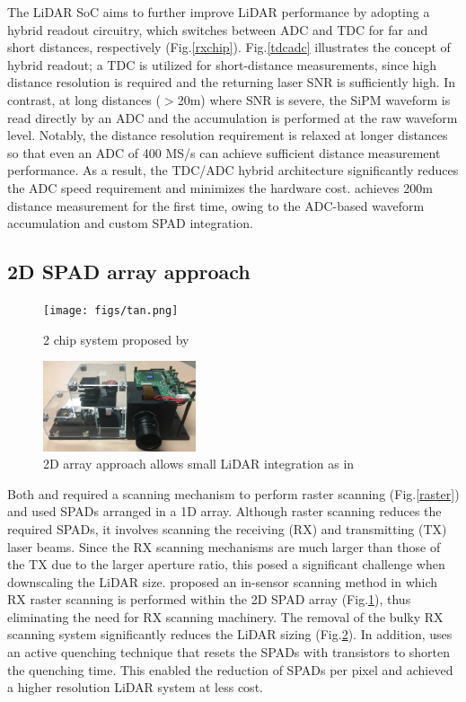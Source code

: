 \documentclass[paper]{ieice}
\begin{document}
The LiDAR SoC \cite{yoshioka201820} aims to further improve LiDAR performance by adopting a hybrid readout circuitry, which switches between ADC and TDC for far and short distances, respectively (Fig.\ref{rxchip}). 
Fig.\ref{tdcadc} illustrates the concept of hybrid readout; a TDC is utilized for short-distance measurements, since high distance resolution is required and the returning laser SNR is sufficiently high. In contrast, at long distances ($>$20m) where SNR is severe, the SiPM waveform is read directly by an ADC and the accumulation is performed at the raw waveform level. Notably, the distance resolution requirement is relaxed at longer distances so that even an ADC of 400 MS/s can achieve sufficient distance measurement performance. As a result, the TDC/ADC hybrid architecture significantly reduces the ADC speed requirement and minimizes the hardware cost. \cite{yoshioka201820} achieves 200m distance measurement for the first time, owing to the ADC-based waveform accumulation and custom SPAD integration.

\subsection{2D SPAD array approach}
\begin{figure}[!t]
\centering
 \texttt{[image: figs/tan.png]}
  \caption{2 chip system proposed by \cite{ta20202d}}
\label{tan}
\end{figure}

\begin{figure}[!t]
\centering
 \includegraphics[width=0.4\textwidth]{figs/toshiba-proto.png}
  \caption{2D array approach allows small LiDAR integration as in \cite{ieee}}
\label{ieee}
\end{figure}

\qquad Both \cite{niclass20130} and \cite{yoshioka201820} required a scanning mechanism to perform raster scanning (Fig.\ref{raster}) and used SPADs arranged in a 1D array.
Although raster scanning reduces the required SPADs, it involves scanning the receiving (RX) and transmitting (TX) laser beams. Since the RX scanning mechanisms are much larger than those of the TX due to the larger aperture ratio, this posed a significant challenge when downscaling the LiDAR size.
\cite{ta20202d} proposed an in-sensor scanning method in which RX raster scanning is performed within the 2D SPAD array (Fig.\ref{tan}), thus eliminating the need for RX scanning machinery.
The removal of the bulky RX scanning system significantly reduces the LiDAR sizing (Fig.\ref{ieee}).
In addition, \cite{ta20202d} uses an active quenching technique that resets the SPADs with transistors to shorten the quenching time. This enabled the reduction of SPADs per pixel and \cite{ta20202d} achieved a higher resolution LiDAR system at less cost.
\end{document}
